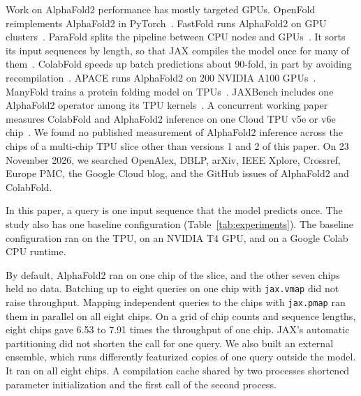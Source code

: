 Work on AlphaFold2 performance has mostly targeted GPUs. OpenFold reimplements AlphaFold2 in
PyTorch~\cite{ahdritz2024openfold}. FastFold runs AlphaFold2 on GPU clusters~\cite{cheng2024fastfold}. ParaFold splits
the pipeline between CPU nodes and GPUs~\cite{zhong2022parafold}. It sorts its input sequences by length, so that JAX
compiles the model once for many of them~\cite{zhong2022parafold}. ColabFold speeds up batch predictions about 90-fold, in part by avoiding recompilation~\cite{colabfold2022}. %
APACE runs AlphaFold2 on 200 NVIDIA A100 GPUs~\cite{apace2024}. %
ManyFold trains a protein folding model on TPUs~\cite{villegasmorcillo2023manyfold}. JAXBench includes one AlphaFold2
operator among its TPU kernels~\cite{jaxbench2026}. A concurrent working paper measures ColabFold and AlphaFold2 inference on one
Cloud TPU v5e or v6e chip~\cite{forsyth2026timetoscience}. We found no published measurement of AlphaFold2 inference
across the chips of a multi-chip TPU slice other than versions 1 and 2 of this paper.
On 23 November 2026, we searched OpenAlex, DBLP, arXiv, IEEE Xplore, Crossref, Europe PMC, the Google Cloud blog, and the GitHub issues of AlphaFold2 and ColabFold. %

In this paper, a query is one input sequence that the model predicts once.
The study also has one baseline configuration (Table~\ref{tab:experiments}).
The baseline configuration ran on the TPU, on an NVIDIA T4 GPU, and on a Google Colab CPU runtime.

By default, AlphaFold2 ran on one chip of the slice, and the other seven chips held no data. Batching up to eight
queries on one chip with \texttt{jax.vmap} did not raise throughput. Mapping independent queries to the chips with
\texttt{jax.pmap} ran them in parallel on all eight chips. On a grid of chip counts and sequence lengths, eight chips gave 6.53 to 7.91 times the throughput of one chip. %
JAX's automatic partitioning did not shorten the call for one query. We also built an external ensemble, which runs
differently featurized copies of one query outside the model. It ran on all eight chips. A compilation cache shared by
two processes shortened parameter initialization and the first call of the second process.

